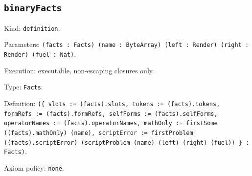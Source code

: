 \documentclass[11pt]{article}
\begin{document}
\subsection*{\texttt{binaryFacts}}
\noindent Kind: \texttt{definition}.\par
\noindent Parameters: \texttt{(facts : Facts) (name : ByteArray) (left : Render) (right : Render) (fuel : Nat)}.\par
\noindent Execution: executable, non-escaping closures only.\par
\noindent Type: \texttt{Facts}.\par
\noindent Definition: \texttt{(\{ slots := (facts).slots, tokens := (facts).tokens, formRefs := (facts).formRefs, selfForms := (facts).selfForms, operatorNames := (facts).operatorNames, mathOnly := firstSome ((facts).mathOnly) (name), scriptError := firstProblem ((facts).scriptError) (scriptProblem (name) (left) (right) (fuel)) \} : Facts)}.\par
\noindent Axiom policy: \texttt{none}.\par
\end{document}

